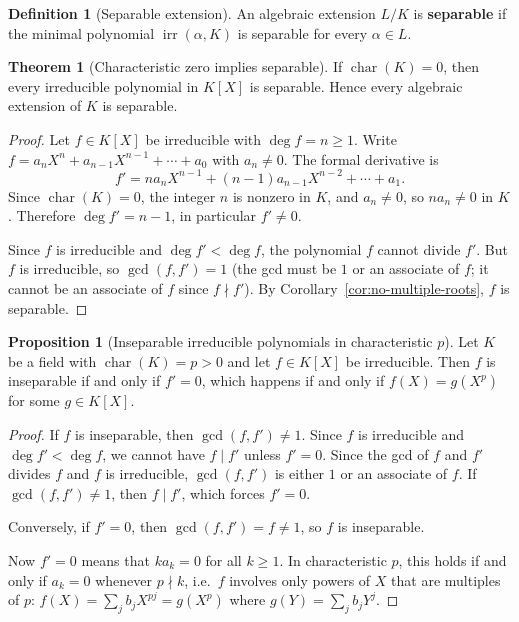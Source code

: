 \documentclass[12pt,a4paper,openany]{book}
\theoremstyle{definition}
\newtheorem{definition}{Definition}[chapter]
\newtheorem{theorem}{Theorem}[chapter]
\newtheorem{proposition}{Proposition}[chapter]
\theoremstyle{remark}
\DeclareMathOperator{\chr}{char}
\renewcommand{\deg}{\operatorname{deg}}
\DeclareMathOperator{\irr}{irr}
\begin{document}
\begin{definition}[Separable extension]
\label{def:separable-extension}
An algebraic extension $L/K$ is \textbf{separable} if the minimal
polynomial $\irr(\alpha, K)$ is separable for every $\alpha \in L$.
\end{definition}

\begin{theorem}[Characteristic zero implies separable]
\label{thm:char0-separable}
If $\chr(K) = 0$, then every irreducible polynomial in $K[X]$ is
separable. Hence every algebraic extension of $K$ is separable.
\end{theorem}

\begin{proof}
Let $f \in K[X]$ be irreducible with $\deg f = n \ge 1$. Write
$f = a_n X^n + a_{n-1}X^{n-1} + \cdots + a_0$ with $a_n \ne 0$. The
formal derivative is
\[
  f' = n a_n X^{n-1} + (n-1)a_{n-1}X^{n-2} + \cdots + a_1.
\]
Since $\chr(K) = 0$, the integer $n$ is nonzero in $K$, and
$a_n \ne 0$, so $n a_n \ne 0$ in $K$. Therefore $\deg f' = n - 1$,
in particular $f' \ne 0$.

Since $f$ is irreducible and $\deg f' < \deg f$, the polynomial $f$
cannot divide $f'$. But $f$ is irreducible, so $\gcd(f, f') = 1$
(the gcd must be $1$ or an associate of $f$; it cannot be an
associate of $f$ since $f \nmid f'$). By
Corollary~\ref{cor:no-multiple-roots}, $f$ is separable.
\end{proof}

\begin{proposition}[Inseparable irreducible polynomials in
  characteristic $p$]
\label{prop:inseparable-char-p}
Let $K$ be a field with $\chr(K) = p > 0$ and let $f \in K[X]$ be
irreducible. Then $f$ is inseparable if and only if $f' = 0$, which
happens if and only if $f(X) = g(X^p)$ for some $g \in K[X]$.
\end{proposition}

\begin{proof}
If $f$ is inseparable, then $\gcd(f, f') \ne 1$. Since $f$ is
irreducible and $\deg f' < \deg f$, we cannot have $f \mid f'$
unless $f' = 0$. Since the gcd of $f$ and $f'$ divides $f$ and $f$
is irreducible, $\gcd(f,f')$ is either $1$ or an associate of $f$.
If $\gcd(f,f') \ne 1$, then $f \mid f'$, which forces $f' = 0$.

Conversely, if $f' = 0$, then $\gcd(f,f') = f \ne 1$, so $f$ is
inseparable.

Now $f' = 0$ means that $k a_k = 0$ for all $k \ge 1$. In
characteristic $p$, this holds if and only if $a_k = 0$ whenever
$p \nmid k$, i.e.\ $f$ involves only powers of $X$ that are
multiples of $p$: $f(X) = \sum_j b_j X^{pj} = g(X^p)$ where
$g(Y) = \sum_j b_j Y^j$.
\end{proof}
\end{document}
